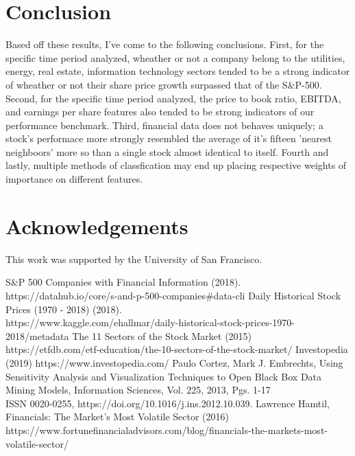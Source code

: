 \documentclass[12pt]{article}
\begin{document}
	\section*{Conclusion}\vspace{-2ex}
	Based off these results, I've come to the following conclusions. First, for the specific time period analyzed, wheather or not a company belong to the utilities, energy, real estate, information technology sectors tended to be a strong indicator of wheather or not their share price growth surpassed that of the S\&P-500. Second, for the specific time period analyzed, the price to book ratio, EBITDA, and earnings per share features also tended to be  strong indicators of our performance benchmark. Third, financial data does not behaves uniquely; a stock's performace more strongly resembled the average of it's fifteen 'nearest neighboors' more so than a single stock almost identical to itself. Fourth and lastly, multiple methods of classfication may end up placing respective weights of importance on different features.
	\vspace{-3.5ex}
	\section*{Acknowledgements}\vspace{-2ex}
	This work was supported by the University of San Francisco.
	\vspace{-3.5ex}
	\begin{thebibliography}{9}
			\vspace{-2ex}
		S\&P 500 Companies with Financial Information (2018). \\
		https://datahub.io/core/s-and-p-500-companies\#data-cli
					\vspace{-1.5ex}
		Daily Historical Stock Prices (1970 - 2018) (2018).\\
		https://www.kaggle.com/ehallmar/daily-historical-stock-prices-1970-2018/metadata
							\vspace{-1.5ex}
		The 11 Sectors of the Stock Market (2015) \\
		https://etfdb.com/etf-education/the-10-sectors-of-the-stock-market/
							\vspace{-1.5ex}
		Investopedia (2019)
		https://www.investopedia.com/
							\vspace{-1.5ex}
		Paulo Cortez, Mark J. Embrechts,
		Using Sensitivity Analysis and Visualization Techniques to Open Black Box Data Mining Models,
		Information Sciences,
		Vol. 225,
		2013,
		Pgs. 1-17 \\
		ISSN 0020-0255,
		https://doi.org/10.1016/j.ins.2012.10.039.
									\vspace{-1.5ex}
				Lawrence Hamtil, Financials: The Market’s Most Volatile Sector (2016)
		https://www.fortunefinancialadvisors.com/blog/financials-the-markets-most-volatile-sector/
	\end{thebibliography}
	\vspace{-6ex}
\end{document}
